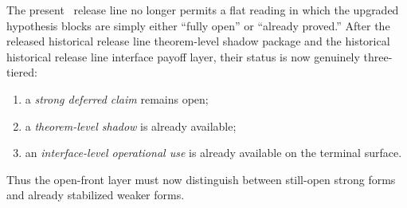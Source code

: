 \begin{remark}
\label{rem:v321-synchronized-status-reading-upgraded-hypothesis-layer}
The present \docversion\ release line no longer permits a flat reading in which the upgraded hypothesis blocks are simply either ``fully open'' or ``already proved.'' After the released historical release line theorem-level shadow package and the historical historical release line interface payoff layer, their status is now genuinely three-tiered:
\begin{enumerate}[leftmargin=2em,label=(\roman*)]
 \item a \emph{strong deferred claim} remains open;
 \item a \emph{theorem-level shadow} is already available;
 \item an \emph{interface-level operational use} is already available on the terminal surface.
\end{enumerate}
Thus the open-front layer must now distinguish between still-open strong forms and already stabilized weaker forms.
\end{remark}

